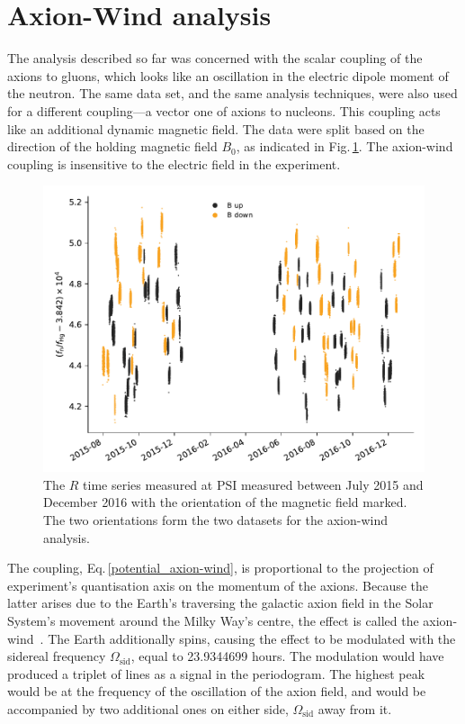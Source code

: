 \section{Axion-Wind analysis}
The analysis described so far was concerned with the scalar coupling of the axions to gluons, which looks like an oscillation in the electric dipole moment of the neutron.
The same data set, and the same analysis techniques, were also used for a different coupling---a vector one of axions to nucleons. This coupling acts like an additional dynamic magnetic field. The data were split based on the direction of the holding magnetic field $B_0$, as indicated in Fig.\,\ref{fig:axions_wind_time_domain}. The axion-wind coupling is insensitive to the electric field in the experiment.

\begin{figure}
  \centering
  \includegraphics[width=\linewidth]{gfx/axions/wind_winddeltah4mm_time_domain_inset_no_yerr.pdf}
  \caption{The $R$ time series measured at PSI measured between July 2015 and December 2016 with the orientation of the magnetic field marked. The two orientations form the two datasets for the axion-wind analysis.}\label{fig:axions_wind_time_domain}
\end{figure}

The coupling, Eq.\,\ref{potential_axion-wind}, is proportional to the projection of experiment's quantisation axis on the momentum of the axions.
Because the latter arises due to the Earth's traversing the galactic axion field in the Solar System's movement around the Milky Way's centre, the effect is called the axion-wind~\cite{Stadnik2014A}.
The Earth additionally spins, causing the effect to be modulated with the sidereal frequency $\Omega_\text{sid}$, equal to \num[detect-all=true]{23.9344699} hours. 
The modulation would have produced a triplet of lines as a signal in the periodogram.
The highest peak would be at the frequency of the oscillation of the axion field, and would be accompanied by two additional ones on either side, $\Omega_\text{sid}$ away from it.

